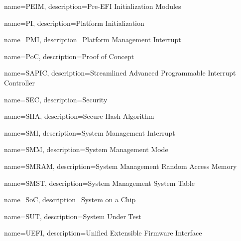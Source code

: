  {
    name=PEIM,
    description={Pre-EFI Initialization Modules
    }
}

 {
	name=PI,
	description={Platform Initialization
	}
}

 {
	name=PMI,
	description={Platform Management Interrupt
	}
}

 {
	name=PoC,
	description={Proof of Concept
	}
}

 {
	name=SAPIC,
	description={Streamlined Advanced Programmable Interrupt Controller
	}
}

 {
	name=SEC,
	description={Security
	}
}

 {
	name=SHA,
	description={Secure Hash Algorithm
	}
}

 {
	name=SMI,
	description={System Management Interrupt
	}
}

 {
	name=SMM,
	description={System Management Mode
	}
}


 {
	name=SMRAM,
	description={System Management Random Access Memory
	}
}


 {
	name=SMST,
	description={System Management System Table
	}
}

 {
	name=SoC,
	description={System on a Chip
	}
}


 {
	name=SUT,
	description={System Under Test
	}
}

 {
	name=UEFI,
	description={Unified Extensible Firmware Interface
	}
}
